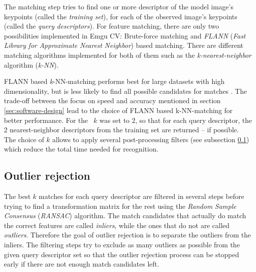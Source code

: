 The matching step tries to find one or more descriptor of the model image's keypoints (called the \emph{training set}), for each of the observed image's keypoints (called the \emph{query descriptors}). For feature matching, there are only two possibilities implemented in Emgu CV: Brute-force matching and \emph{FLANN} (\emph{Fast Library for Approximate Nearest Neighbor}) \cite{flann} based matching. There are different matching algorithms implemented for both of them such as the \emph{k-nearest-neighbor} algorithm (\emph{k-NN}).

FLANN based \emph{k}-NN-matching performs best for large datasets with high dimensionality, but is less likely to find all possible candidates for matches \cite{flann}. The trade-off between the focus on speed and accuracy mentioned in section \ref{sec:software-design} lead to the choice of FLANN based k-NN-matching for better performance. For the \vd~$k$ was set to $2$, so that for each query descriptor, the $2$ nearest-neighbor descriptors from the training set are returned -- if possible. The choice of $k$ allows to apply several post-processing filters (see subsection \ref{sec:tech-bg:subsec:outlier-rejection}) which reduce the total time needed for recognition.

\subsection{Outlier rejection}\label{sec:tech-bg:subsec:outlier-rejection}

The best $k$ matches for each query descriptor are filtered in several steps before trying to find a transformation matrix for the rest using the \emph{Random Sample Consensus} (\emph{RANSAC}) \cite{ransac} algorithm. The match candidates that actually do match the correct features are called \emph{inliers}, while the ones that do not are called \emph{outliers}. Therefore the goal of outlier rejection is to separate the outliers from the inliers. The filtering steps try to exclude as many outliers as possible from the given query descriptor set so that the outlier rejection process can be stopped early if there are not enough match candidates left.

